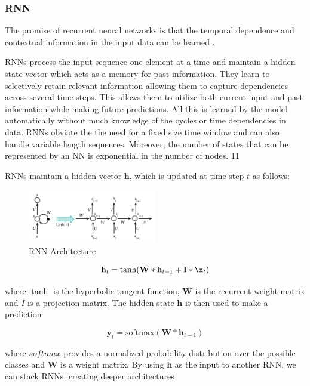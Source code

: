 \documentclass[5p]{elsarticle}
\begin{document}
\subsubsection{RNN}
The promise of recurrent neural networks is that the temporal dependence and contextual
information in the input data can be learned\cite{Bengio1994LearningDifficult} \cite{ChoLearningTranslation}. 

RNNs process the input sequence one element at a time and maintain a hidden
state vector which acts as a memory for past information. They learn to selectively retain relevant information allowing them to capture dependencies across several time steps. This allows them to utilize both current input and past information while making future predictions. All this is learned by the model automatically without much knowledge of the cycles or time dependencies in data. RNNs obviate the the need for a fixed size time window and can also handle variable length sequences. Moreover, the number of states that can be represented by an NN is exponential in the number of nodes.
11

RNNs maintain a hidden vector $\mathbf h$, which is updated at time step $t$ as follows:
 
\begin{figure}[h]
    \centering
    \includegraphics[width=0.5\textwidth]{RNN.png}
    \caption{RNN Architecture}
    \label{fig:RNN}
\end{figure}

\begin{equation}
	\mathbf h_t = \tanh(\mathbf W * \mathbf h_{t-1} + \mathbf I * \x_t)
\end{equation}

where $\tanh$ is the hyperbolic tangent function, $\mathbf W$ is the recurrent weight matrix and $I$ is a projection matrix. The hidden state $\mathbf h$ is then used to make a prediction

\begin{equation}
	\mathbf y_t = \text{softmax}(\mathbf W * \mathbf h_{t-1})
\end{equation}

where $\textit{softmax}$ provides a normalized probability distribution over the possible classes and $\mathbf W$ is a weight matrix. By using $\mathbf h$ as the input to another RNN, we can stack RNNs, creating deeper architectures \citep{pascanu2013construct}
\end{document}
